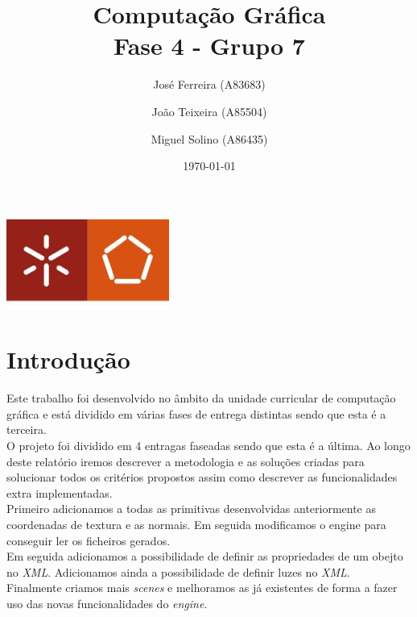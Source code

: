 \documentclass[a4paper]{report}
\begin{document}
\title{Computação Gráfica\\
\large Fase 4 - Grupo 7}
\author{José Ferreira (A83683) \and João Teixeira (A85504) \and Miguel Solino (A86435)}
\date{\today}

\begin{center}
    \begin{minipage}{0.75\linewidth}
        \centering
        \includegraphics[width=0.4\textwidth]{images/eng.jpeg}\par\vspace{1cm}
        \vspace{1.5cm}
        \href{https://www.uminho.pt/PT}
        {\color{black}{\scshape\LARGE Universidade do Minho}} \par
        \vspace{1cm}
        \href{https://www.di.uminho.pt/}
        {\color{black}{\scshape\Large Departamento de Informática}} \par
        \vspace{1.5cm}
        \maketitle
    \end{minipage}
\end{center}

\tableofcontents

\chapter{Introdução}
Este trabalho foi desenvolvido no âmbito da unidade curricular de computação
gráfica e está dividido em várias fases de entrega distintas sendo que esta é a
terceira.\\
O projeto foi dividido em 4 entragas faseadas sendo que esta é a última. Ao
longo deste relatório iremos descrever a metodologia e as soluções criadas para
solucionar todos os critérios propostos assim como descrever as funcionalidades
extra implementadas.\\
Primeiro adicionamos a todas as primitivas desenvolvidas anteriormente as
coordenadas de textura e as normais. Em seguida modificamos o engine para
conseguir ler os ficheiros gerados.\\
Em seguida adicionamos a possibilidade de definir as propriedades de um obejto
no \textit{XML}. Adicionamos ainda a possibilidade de definir luzes no
\textit{XML}.\\
Finalmente criamos mais \textit{scenes} e melhoramos as já existentes de forma a
fazer uso das novas funcionalidades do \textit{engine}.\\
\end{document}
